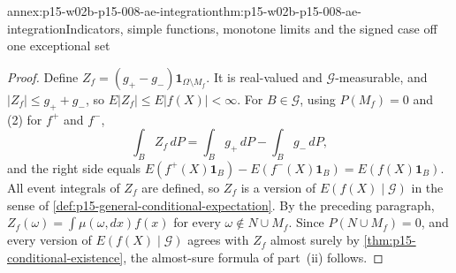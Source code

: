 \begin{annexitem}{annex:p15-w02b-p15-008-ae-integration}{thm:p15-w02b-p15-008-ae-integration}{Indicators, simple functions, monotone limits and the signed case off one exceptional set}
\begin{proof}
Define \(Z_f=(g_+-g_-)\mathbf1_{\Omega\setminus M_f}\). It is real-valued
and \(\mathcal G\)-measurable, and \(|Z_f|\leq g_++g_-\), so
\(E|Z_f|\leq E|f(X)|<\infty\). For \(B\in\mathcal G\), using
\(P(M_f)=0\) and (2) for \(f^+\) and \(f^-\),
\[
 \int_BZ_f\,dP=\int_Bg_+\,dP-\int_Bg_-\,dP,
\]
and the right side equals
\(E(f^+(X)\mathbf1_B)-E(f^-(X)\mathbf1_B)=E(f(X)\mathbf1_B)\).
All event integrals of \(Z_f\) are defined, so \(Z_f\) is a version of
\(E(f(X)\mid\mathcal G)\) in the sense of
\cref{def:p15-general-conditional-expectation}. By the preceding paragraph,
\(Z_f(\omega)=\int\mu(\omega,dx)f(x)\) for every
\(\omega\notin N\cup M_f\). Since \(P(N\cup M_f)=0\), and every version of
\(E(f(X)\mid\mathcal G)\) agrees with \(Z_f\) almost surely by
\cref{thm:p15-conditional-existence}, the almost-sure formula of part~(ii)
follows.
\end{proof}
\end{annexitem}

